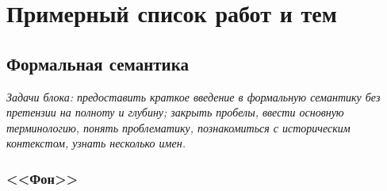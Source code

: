 \documentclass[a4paper,12pt]{article}
\begin{document}
\section{Примерный список работ и тем}

\subsection{Формальная семантика}

\textit{Задачи блока: предоставить краткое введение в формальную семантику без претензии на полноту и глубину; закрыть пробелы, ввести основную терминологию, понять проблематику, познакомиться с историческим контекстом, узнать несколько имен.}

\subsubsection{<<Фон>>}
\end{document}
